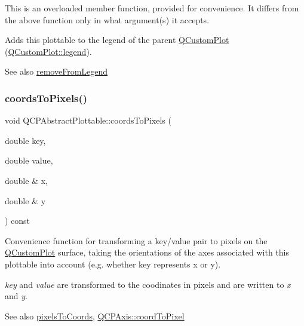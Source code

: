 This is an overloaded member function, provided for convenience. It differs from the above function only in what argument(s) it accepts.

Adds this plottable to the legend of the parent \hyperlink{class_q_custom_plot}{Q\+Custom\+Plot} (\hyperlink{class_q_custom_plot_a4eadcd237dc6a09938b68b16877fa6af}{Q\+Custom\+Plot\+::legend}).

\begin{DoxySeeAlso}{See also}
\hyperlink{class_q_c_p_abstract_plottable_a3cc235007e2343a65ad4f463767e0e20}{remove\+From\+Legend} 
\end{DoxySeeAlso}
\mbox{\label{class_q_c_p_abstract_plottable_a7ad84a36472441cf1f555c5683d0da93}} 
\subsubsection{\texorpdfstring{coords\+To\+Pixels()}{coordsToPixels()}\hspace{0.1cm}{\footnotesize\ttfamily [1/2]}}
{\footnotesize\ttfamily void Q\+C\+P\+Abstract\+Plottable\+::coords\+To\+Pixels (\begin{DoxyParamCaption}\item[{double}]{key,  }\item[{double}]{value,  }\item[{double \&}]{x,  }\item[{double \&}]{y }\end{DoxyParamCaption}) const}

Convenience function for transforming a key/value pair to pixels on the \hyperlink{class_q_custom_plot}{Q\+Custom\+Plot} surface, taking the orientations of the axes associated with this plottable into account (e.\+g. whether key represents x or y).

{\itshape key} and {\itshape value} are transformed to the coodinates in pixels and are written to {\itshape x} and {\itshape y}.

\begin{DoxySeeAlso}{See also}
\hyperlink{class_q_c_p_abstract_plottable_a3903c1120ab5c27e7fa46b597ef267bd}{pixels\+To\+Coords}, \hyperlink{class_q_c_p_axis_af15d1b3a7f7e9b53d759d3ccff1fe4b4}{Q\+C\+P\+Axis\+::coord\+To\+Pixel} 
\end{DoxySeeAlso}
\mbox{\label{class_q_c_p_abstract_plottable_a5acb50ae984eef09a7ab92315d2ad708}} 

